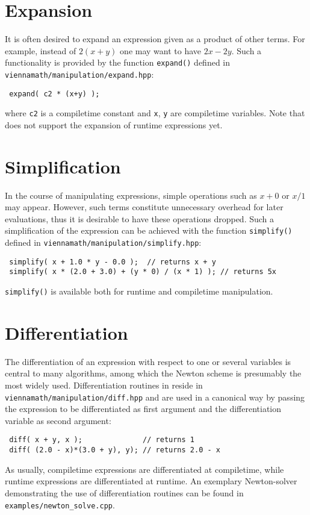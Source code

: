  \section{Expansion}
It is often desired to expand an expression given as a product of other terms. For example, instead of $2(x+y)$ one may want to have $2x - 2y$.
Such a functionality is provided by the function \lstinline|expand()| defined in \lstinline|viennamath/manipulation/expand.hpp|:
\begin{lstlisting}
 expand( c2 * (x+y) );
\end{lstlisting}
where \lstinline|c2| is a compiletime constant and \lstinline|x|, \lstinline|y| are compiletime variables.
Note that {\ViennaMathversion} does not support the expansion of runtime expressions yet.




 \section{Simplification}
In the course of manipulating expressions, simple operations such as $x+0$ or $x/1$ may appear.
However, such terms constitute unnecessary overhead for later evaluations, thus it is desirable to have these operations dropped.
Such a simplification of the expression can be achieved with the function \lstinline|simplify()| defined in \lstinline|viennamath/manipulation/simplify.hpp|:
\begin{lstlisting}
 simplify( x + 1.0 * y - 0.0 );  // returns x + y
 simplify( x * (2.0 + 3.0) + (y * 0) / (x * 1) ); // returns 5x
\end{lstlisting}
\lstinline|simplify()| is available both for runtime and compiletime manipulation.


 \section{Differentiation}
The differentiation of an expression with respect to one or several variables is central to many algorithms, among which the Newton scheme is presumably the
most widely used. Differentiation routines in {\ViennaMath} reside in \lstinline|viennamath/manipulation/diff.hpp| and are used in a canonical way by passing
the expression to be differentiated as first argument and the differentiation variable as second argument:
\begin{lstlisting}
 diff( x + y, x );              // returns 1
 diff( (2.0 - x)*(3.0 + y), y); // returns 2.0 - x
\end{lstlisting}
As usually, compiletime expressions are differentiated at compiletime, while runtime expressions are differentiated at runtime.
An exemplary Newton-solver demonstrating the use of differentiation routines can be found in \lstinline|examples/newton_solve.cpp|.



